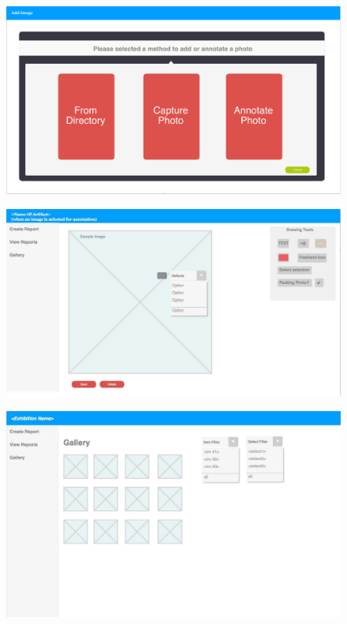 \documentclass[12pt]{article}
\begin{document}
\begin{figure}
  \includegraphics[scale=0.5]{mockup4.png}
\end{figure}
\begin{figure}
  \includegraphics[scale=0.5]{mockup5.png}
\end{figure}
\begin{figure}
  \includegraphics[scale=0.5]{mockup6.png}
\end{figure}
\end{document}
